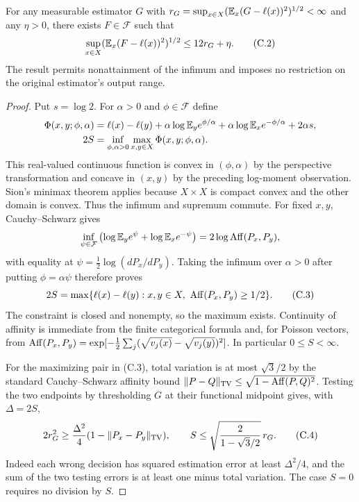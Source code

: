 \begin{lemma}\label{crit:lem:comparison}
For any measurable estimator $G$ with
$r_G=\sup_{x\in X}(\mathbb E_x(G-\ell(x))^2)^{1/2}<\infty$ and any $\eta>0$,
there exists $F\in\mathcal F$ such that
\[
 \sup_{x\in X}(\mathbb E_x(F-\ell(x))^2)^{1/2}\le12r_G+\eta.       \tag{C.2}
\]
The result permits nonattainment of the infimum and imposes no restriction
on the original estimator's output range.
\end{lemma}
\begin{proof}
Put $s=\log2$. For $\alpha>0$ and $\phi\in\mathcal F$ define
\begin{align*}
 \Phi(x,y;\phi,\alpha)
 &=\ell(x)-\ell(y)
   +\alpha\log\mathbb E_y e^{\phi/\alpha}
   +\alpha\log\mathbb E_x e^{-\phi/\alpha}+2\alpha s,\\
 2S&=\inf_{\phi,\alpha>0}\max_{x,y\in X}\Phi(x,y;\phi,\alpha).
\end{align*}
This real-valued continuous function is convex in $(\phi,\alpha)$ by the
perspective transformation and concave in $(x,y)$ by the preceding
log-moment observation. Sion's minimax theorem applies because $X\times X$
is compact convex and the other domain is convex. Thus the infimum and
supremum commute. For fixed $x,y$, Cauchy--Schwarz gives
\[
 \inf_{\psi\in\mathcal F}
  \left(\log\mathbb E_y e^\psi+\log\mathbb E_x e^{-\psi}\right)
   =2\log\operatorname{Aff}(P_x,P_y),
\]
with equality at $\psi=\tfrac12\log(dP_x/dP_y)$.
Taking the infimum over $\alpha>0$ after putting $\phi=\alpha\psi$
therefore proves
\[
 2S=\max\{\ell(x)-\ell(y):x,y\in X,\ \Aff(P_x,P_y)\ge1/2\}. \tag{C.3}
\]
The constraint is closed and nonempty, so the maximum exists. Continuity
of affinity is immediate from the finite categorical formula and, for
Poisson vectors, from
$\operatorname{Aff}(P_x,P_y)=\exp[-\tfrac12\sum_j(\sqrt{v_j(x)}-\sqrt{v_j(y)})^2]$.
In particular $0\le S<\infty$.

For the maximizing pair in (C.3), total variation is at most $\sqrt3/2$
by the standard Cauchy--Schwarz affinity bound
$\|P-Q\|_{\rm TV}\le\sqrt{1-\operatorname{Aff}(P,Q)^2}$.
Testing the two endpoints by thresholding $G$ at their functional midpoint
gives, with $\Delta=2S$,
\[
 2r_G^2\ge \frac{\Delta^2}{4}
           (1-\|P_x-P_y\|_{\rm TV}),\qquad
 S\le\sqrt{\frac{2}{1-\sqrt3/2}}\,r_G.                    \tag{C.4}
\]
Indeed each wrong decision has squared estimation error at least
$\Delta^2/4$, and the sum of the two testing errors is at least one minus
total variation. The case $S=0$ requires no division by $S$.


\end{proof}
